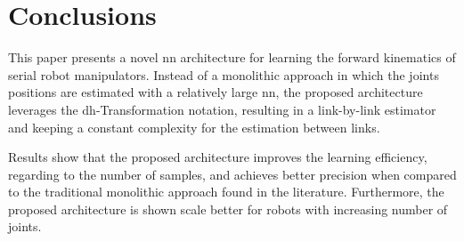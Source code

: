 \section{Conclusions}\label{sec: conclusions}

This paper presents a novel \gls{nn} architecture for learning the forward kinematics of serial robot manipulators.
%
Instead of a monolithic approach in which the joints positions are estimated with a relatively large \gls{nn}, the proposed architecture leverages the \gls{dh}-Transformation notation, resulting in a link-by-link estimator and keeping a constant complexity for the estimation between links.

Results show that the proposed architecture improves the learning efficiency, regarding to the number of samples, and achieves better precision when compared to the traditional monolithic approach found in the literature.
%
Furthermore, the proposed architecture is shown scale better for robots with increasing number of joints.
 